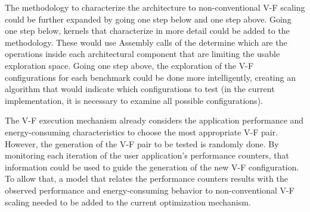 The methodology to characterize the architecture to non-conventional V-F scaling could be further expanded by going one step below and one step above. Going one step below,  kernels that characterize in more detail could be added to the methodology. These would use Assembly calls of the determine which are the operations inside each architectural component that are limiting the usable exploration space. Going one step above, the exploration of the V-F configurations for each benchmark could be done more intelligently, creating an algorithm that would indicate which configurations to test (in the current implementation, it is necessary to examine all possible configurations).

The V-F execution mechanism already considers the application performance and energy-consuming characteristics to choose the most appropriate V-F pair. However, the generation of the V-F pair to be tested is randomly done. By monitoring each iteration of the user application's performance counters, that information could be used to guide the generation of the new V-F configuration. To allow that, a model that relates the performance counters results with the observed performance and energy-consuming behavior to non-conventional V-F scaling needed to be added to the current optimization mechanism.


